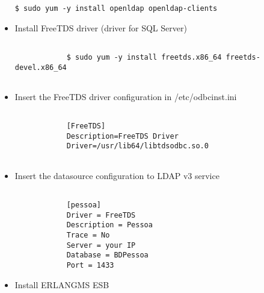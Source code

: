 \begin{itemize}
\begin{lstlisting}[Adding Erlang repository entry, label=passo1]
			$ sudo yum -y install openldap openldap-clients

		\end{lstlisting}
	

	\item Install FreeTDS driver (driver for SQL Server)
	
		\renewcommand{\lstlistingname}{Código}             
		\begin{lstlisting}[Adding Erlang repository entry, label=passo1] 

			$ sudo yum -y install freetds.x86_64 freetds-devel.x86_64
			
		\end{lstlisting}
		
	
	\item  Insert the FreeTDS driver configuration in /etc/odbcinst.ini 

	
		\renewcommand{\lstlistingname}{Código}             
		\begin{lstlisting}[Adding Erlang repository entry, label=passo1] 

			[FreeTDS]
			Description=FreeTDS Driver
			Driver=/usr/lib64/libtdsodbc.so.0
			
		\end{lstlisting}	

	
	\item  Insert the datasource configuration to LDAP v3 service
	
		\renewcommand{\lstlistingname}{Código}             
		\begin{lstlisting}[Adding Erlang repository entry, label=passo1] 

			[pessoa]
			Driver = FreeTDS
			Description = Pessoa
			Trace = No
			Server = your IP
			Database = BDPessoa
			Port = 1433			

		\end{lstlisting}	
	
	
	\item Install ERLANGMS ESB
	
		\renewcommand{\lstlistingname}{Código}             
		\begin{lstlisting}[Adding Erlang repository entry, label=passo1] 


\end{lstlisting}
\end{itemize}
